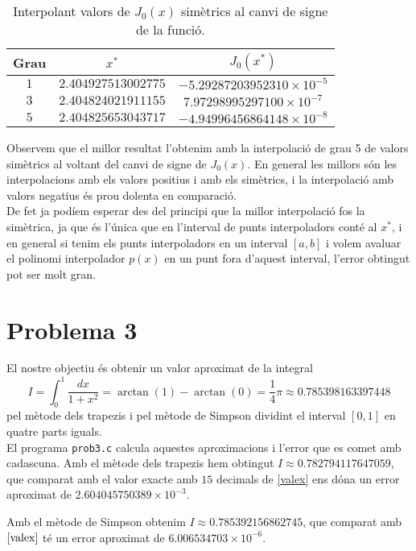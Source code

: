 \documentclass[12pt]{article}
\begin{document}
	\begin{table}[h!]
		\centering
		\caption{Interpolant valors de $J_0(x)$ simètrics al canvi de signe de la funció.}	
		\begin{tabular}{c|c|c}
			Grau & $x^*$ &$J_0(x^*)$\\
			\hline
			\hline
			$1$ & $2.404927513002775$  &$-5.29287203952310\times10^{-5}$\\
			$3$ & $2.404824021911155$ &$7.97298995297100\times10^{-7}$\\
			$5$ & $2.404825653043717$ &$-4.94996456864148\times10^{-8}
			$\\
		\end{tabular}
	\end{table}
	Observem que el millor resultat l'obtenim amb la interpolació de grau 5 de valors simètrics al voltant del canvi de signe de $J_0(x)$. En general les millors són les interpolacions amb els valors positius i amb els simètrics, i la interpolació amb valors negatius és prou dolenta en comparació.\\
	
	De fet ja podíem esperar des del principi que la millor interpolació fos la simètrica, ja que és l'única que en l'interval de punts interpoladors conté al $x^*$, i en general si tenim els punts interpoladors en un interval $[a,b]$ i volem avaluar el polinomi interpolador $p(x)$ en un punt fora d'aquest interval, l'error obtingut pot ser molt gran.
	
	\newpage
	\section*{Problema 3}
	El nostre objectiu és obtenir un valor aproximat de la integral
	\begin{equation}\label{valex}
		I=\int^{1}_0\dfrac{dx}{1+x^2}=\arctan(1)-\arctan(0)=\frac{1}{4}\pi\approx0.785398163397448
	\end{equation}
	pel mètode dels trapezis i pel mètode de Simpson dividint el interval $[0,1]$ en quatre parts iguals.\\
	
	El programa \texttt{prob3.c} calcula aquestes aproximacions i l'error que es comet amb cadascuna. Amb el mètode dels trapezis hem obtingut $I\approx0.782794117647059$, que comparat amb el valor exacte amb $15$ decimals de \eqref{valex} ens dóna un error aproximat de $2.604045750389\times10^{-3}$.
	
	
	Amb el mètode de Simpson obtenim $I\approx0.785392156862745$, que comparat amb $\eqref{valex}$ té un error aproximat de $6.006534703\times10^{-6}$.
	
\end{document}
